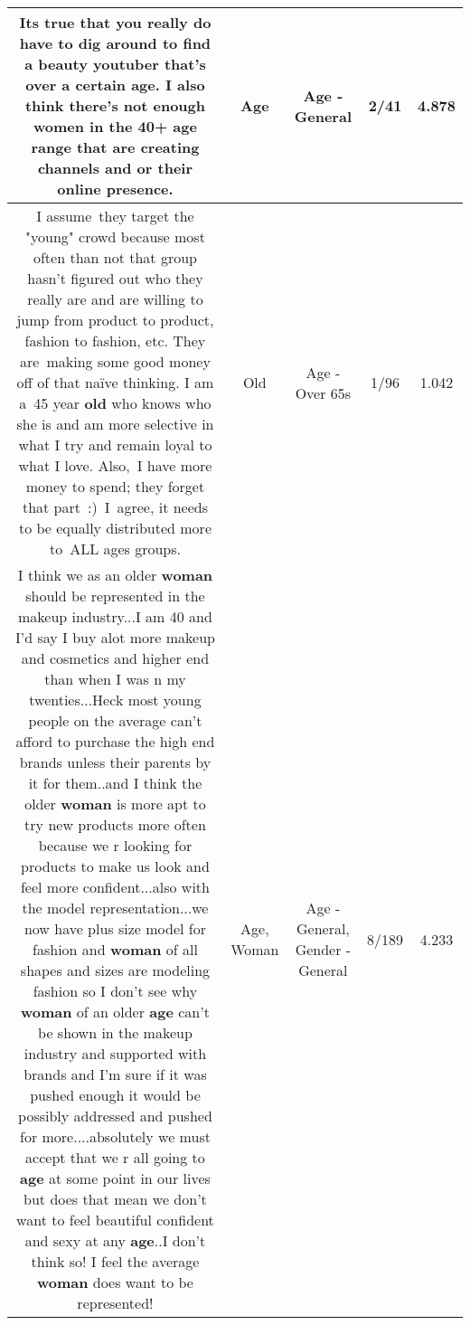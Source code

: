 \documentclass[11pt]{article}
\newlength\mylength
\begin{document}
\begin{center}
\begin{longtable}{|C{.65\mylength}|C{.30\mylength}|C{.12\mylength}|C{.12\mylength}|C{.12\mylength}|}
  \small Its true that you really do have to dig around to find a beauty youtuber that's over a certain \textbf{age}. I also think there's not enough women in the 40+ \textbf{age} range that are creating channels and or their online presence.\normalsize   & Age & Age - General & 2/41 & 4.878 \\  \hline
  \small I assume they target the "young" crowd because most often than not that group hasn't figured out who they really are and are willing to jump from product to product, fashion to fashion, etc. They are making some good money off of that naïve thinking. I am a 45 year \textbf{old} who knows who she is and am more selective in what I try and remain loyal to what I love. Also, I have more money to spend; they forget that part :) I agree, it needs to be equally distributed more to ALL ages groups.\normalsize   & Old & Age - Over 65s & 1/96 & 1.042 \\  \hline
  \small I think we as an older \textbf{woman} should be represented in the makeup industry...I am 40 and I'd say I buy alot more makeup and cosmetics and higher end than when I was n my twenties...Heck most young people on the average can't afford to purchase the high end brands unless their parents by it for them..and I think the older \textbf{woman} is more apt to try new products more often because we r looking for products to make us look and feel more confident...also with the model representation...we now have plus size model for fashion and \textbf{woman} of all shapes and sizes are modeling fashion so I don't see why \textbf{woman} of an older \textbf{age} can't be shown in the makeup industry and supported with brands and I'm sure if it was pushed enough it would be possibly addressed and pushed for more....absolutely we must accept that we r all going to \textbf{age} at some point in our lives but does that mean we don't want to feel beautiful confident and sexy at any \textbf{age}..I don't think so! I feel the average \textbf{woman} does want to be represented!\normalsize   & Age, Woman & Age - General, Gender - General & 8/189 & 4.233 \\  \hline

\end{longtable}
\end{center}
\end{document}
